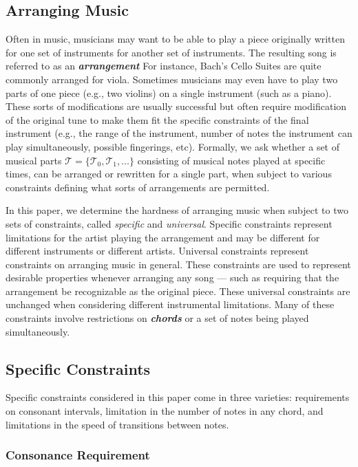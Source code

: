\documentclass[11pt,letterpaper]{article}
\newcommand{\term}[2]{\textbf{\it #1}}
\begin{document}
\subsection{Arranging Music}
Often in music, musicians may want to be able to play a piece originally written for one set of instruments for another set of instruments. The resulting song is referred to as an \term{arrangement}. For instance, Bach's Cello Suites are quite commonly arranged for viola. Sometimes musicians may even have to play two parts of one piece (e.g., two violins) on a single instrument (such as a piano). These sorts of modifications are usually successful but often require modification of the original tune to make them fit the specific constraints of the final instrument (e.g., the range of the instrument, number of notes the instrument can play simultaneously, possible fingerings, etc). Formally, we ask whether a set of musical parts $\mathcal{T} = \{\mathcal{T}_0, \mathcal{T}_1, \dots \}$ consisting of musical notes played at specific times, can be arranged or rewritten for a single part, when subject to various constraints defining what sorts of arrangements are permitted.

In this paper, we determine the hardness of arranging music when subject to two sets of constraints, called \emph{specific} and \emph{universal}. Specific constraints represent limitations for the artist playing the arrangement and may be different for different instruments or different artists. Universal constraints represent constraints on arranging music in general. These constraints are used to represent desirable properties whenever arranging any song --- such as requiring that the arrangement be recognizable as the original piece. These universal constraints are unchanged when considering different instrumental limitations. Many of these constraints involve restrictions on \term{chords}, or a set of notes being played simultaneously.

\subsection{Specific Constraints}
Specific constraints considered in this paper come in three varieties: requirements on consonant intervals, limitation in the number of notes in any chord, and limitations in the speed of transitions between notes.

\subsubsection{Consonance Requirement}
\end{document}
